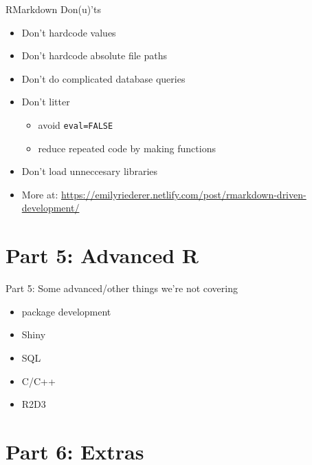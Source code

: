 \documentclass[
  ignorenonframetext,
]{beamer}
\providecommand{\tightlist}{%
  \setlength{\itemsep}{0pt}\setlength{\parskip}{0pt}}
\begin{document}
\begin{frame}[fragile]{RMarkdown Don(u)'ts}
\protect\hypertarget{rmarkdown-donuts}{}

\begin{itemize}
\tightlist
\item
  Don't hardcode values
\item
  Don't hardcode absolute file paths
\item
  Don't do complicated database queries
\item
  Don't litter

  \begin{itemize}
  \tightlist
  \item
    avoid \texttt{eval=FALSE}
  \item
    reduce repeated code by making functions
  \end{itemize}
\item
  Don't load unneccesary libraries
\item
  More at:
  \url{https://emilyriederer.netlify.com/post/rmarkdown-driven-development/}
\end{itemize}

\end{frame}

\hypertarget{part-5-advanced-r}{%
\section{Part 5: Advanced R}\label{part-5-advanced-r}}

\begin{frame}{Part 5: Some advanced/other things we're not covering}
\protect\hypertarget{part-5-some-advancedother-things-were-not-covering}{}

\begin{itemize}
\tightlist
\item
  package development
\item
  Shiny
\item
  SQL
\item
  C/C++
\item
  R2D3
\end{itemize}

\end{frame}

\hypertarget{part-6-extras}{%
\section{Part 6: Extras}\label{part-6-extras}}
\end{document}
